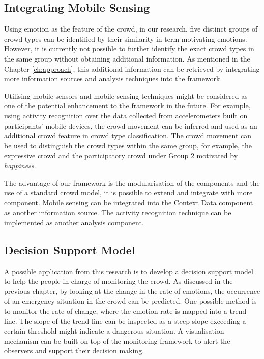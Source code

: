 \subsection{Integrating Mobile Sensing}
Using emotion as the feature of the crowd, in our research, five distinct groups of crowd types can be identified by their similarity in term motivating emotions. However, it is currently not possible to further identify the exact crowd types in the same group without obtaining additional information. As mentioned in the Chapter \ref{ch:approach}, this additional information can be retrieved by integrating more information sources and analysis techniques into the framework. 

Utilising mobile sensors and mobile sensing techniques might be considered as one of the potential enhancement to the framework in the future. For example, using activity recognition over the data collected from accelerometers built on participants’ mobile devices, the crowd movement can be inferred and used as an additional crowd feature in crowd type classification. The crowd movement can be used to distinguish the crowd types within the same group, for example, the expressive crowd and the participatory crowd under Group 2 motivated by \textit{happiness}.

The advantage of our framework is the modularisation of the components and the use of a standard crowd model, it is possible to extend and integrate with more component. Mobile sensing can be integrated into the Context Data component as another information source. The activity recognition technique can be implemented as another analysis component.

\subsection{Decision Support Model}
A possible application from this research is to develop a decision support model to help the people in charge of monitoring the crowd. As discussed in the previous chapter, by looking at the change in the rate of emotions, the occurrence of an emergency situation in the crowd can be predicted. One possible method is to monitor the rate of change, where the emotion rate is mapped into a trend line. The slope of the trend line can be inspected as a steep slope exceeding a certain threshold might indicate a dangerous situation. A visualisation mechanism can be built on top of the monitoring framework to alert the observers and support their decision making.